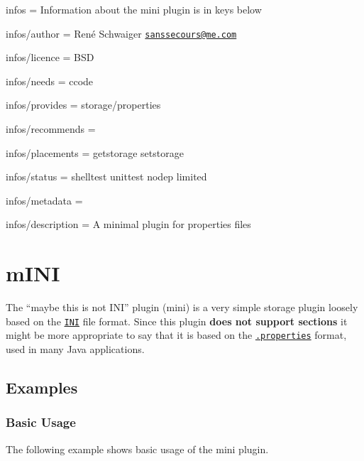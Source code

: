 
\begin{DoxyItemize}
\item infos = Information about the mini plugin is in keys below
\item infos/author = René Schwaiger \href{mailto:sanssecours@me.com}{\tt sanssecours@me.\+com}
\item infos/licence = B\+SD
\item infos/needs = ccode
\item infos/provides = storage/properties
\item infos/recommends =
\item infos/placements = getstorage setstorage
\item infos/status = shelltest unittest nodep limited
\item infos/metadata =
\item infos/description = A minimal plugin for properties files
\end{DoxyItemize}\hypertarget{autotoc_md377_src_plugins_mini_README_md}{}\section{m\+I\+NI}\label{autotoc_md377_src_plugins_mini_README_md}
The “maybe this is not I\+N\+I” plugin ({\ttfamily mini}) is a very simple storage plugin loosely based on the \href{https://en.wikipedia.org/wiki/INI_file}{\tt I\+NI} file format. Since this plugin {\bfseries does not support sections} it might be more appropriate to say that it is based on the \href{https://en.wikipedia.org/wiki/.properties}{\tt .properties} format, used in many Java applications.\hypertarget{autotoc_md377_autotoc_md378}{}\subsection{Examples}\label{autotoc_md377_autotoc_md378}
\hypertarget{autotoc_md377_autotoc_md379}{}\subsubsection{Basic Usage}\label{autotoc_md377_autotoc_md379}
The following example shows basic usage of the {\ttfamily mini} plugin.


